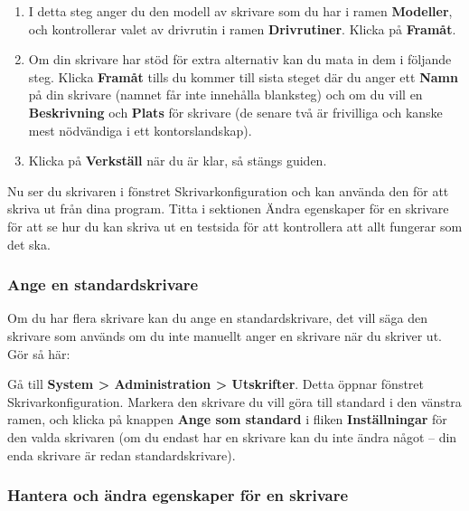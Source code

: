 \documentclass[a4paper,final]{memoir} %
\begin{document}
\begin{enumerate}
\item I detta steg anger du den modell av skrivare som du har i ramen \textbf{Modeller}, och kontrollerar valet av drivrutin i ramen \textbf{Drivrutiner}. Klicka på \textbf{Framåt}.

\item Om din skrivare har stöd för extra alternativ kan du mata in dem i följande steg. Klicka \textbf{Framåt} tills du kommer till sista steget där du anger ett \textbf{Namn} på din skrivare (namnet får inte innehålla blanksteg) och om du vill en \textbf{Beskrivning} och \textbf{Plats} för skrivare (de senare två är frivilliga och kanske mest nödvändiga i ett kontorslandskap). 

\item Klicka på \textbf{Verkställ} när du är klar, så stängs guiden.

\end{enumerate}


Nu ser du skrivaren i fönstret Skrivarkonfiguration och kan använda den för att skriva ut från dina program. Titta i sektionen Ändra egenskaper för en skrivare för att se hur du kan skriva ut en testsida för att kontrollera att allt fungerar som det ska.


\subsubsection{Ange en standardskrivare}

Om du har flera skrivare kan du ange en standardskrivare, det vill säga den skrivare som används om du inte manuellt anger en skrivare när du skriver ut. Gör så här:

Gå till \textbf{System \textgreater{} Administration \textgreater{} Utskrifter}. Detta öppnar fönstret Skrivarkonfiguration. Markera den skrivare du vill göra till standard i den vänstra ramen, och klicka på knappen \textbf{Ange som standard} i fliken \textbf{Inställningar} för den valda skrivaren (om du endast har en skrivare kan du inte ändra något -- din enda skrivare är redan standardskrivare).

\subsubsection{Hantera och ändra egenskaper för en skrivare}
\end{document}
